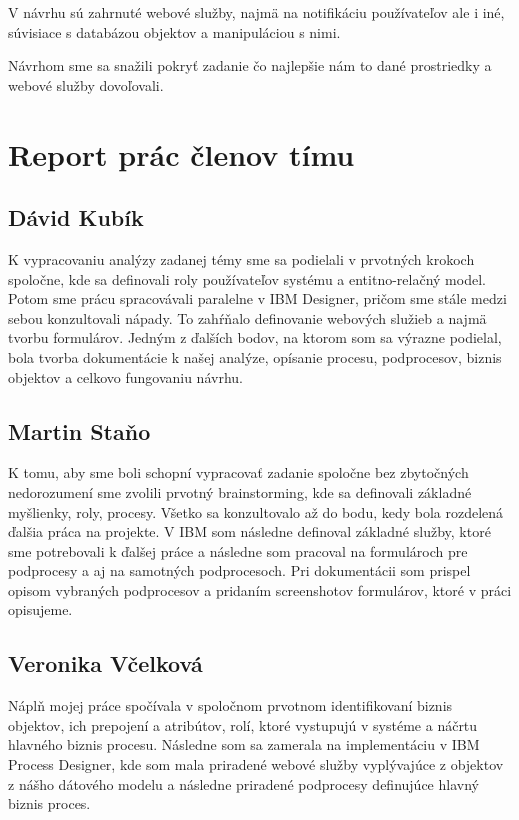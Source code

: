 \documentclass[10pt,oneside,slovak,a4paper]{article}
\begin{document}
V návrhu sú zahrnuté webové služby, najmä na notifikáciu používateľov ale i iné, súvisiace s databázou objektov a manipuláciou s nimi.

Návrhom sme sa snažili pokryť zadanie čo najlepšie nám to dané prostriedky a webové služby dovoľovali.

\section{Report prác členov tímu}
\subsection{Dávid Kubík}
K vypracovaniu analýzy zadanej témy sme sa podielali v prvotných krokoch spoločne, kde sa definovali roly používateľov systému a entitno-relačný model. Potom sme prácu spracovávali paralelne v IBM Designer, pričom sme stále medzi sebou konzultovali nápady. To zahŕňalo definovanie webových služieb a najmä tvorbu formulárov. Jedným z ďalších bodov, na ktorom som sa výrazne podielal, bola tvorba dokumentácie k našej analýze, opísanie procesu, podprocesov, biznis objektov a celkovo fungovaniu návrhu.
\subsection{Martin Staňo}
K tomu, aby sme boli schopní vypracovať zadanie spoločne bez zbytočných nedorozumení sme zvolili prvotný brainstorming, kde sa definovali základné myšlienky, roly, procesy. Všetko sa konzultovalo až do bodu, kedy bola rozdelená ďalšia práca na projekte. V IBM som následne definoval základné služby, ktoré sme potrebovali k ďalšej práce a následne som pracoval na formulároch pre podprocesy a aj na samotných podprocesoch. Pri dokumentácii som prispel opisom vybraných podprocesov a pridaním screenshotov formulárov, ktoré v práci opisujeme.
\subsection{Veronika Včelková}
Náplň mojej práce spočívala v spoločnom prvotnom identifikovaní biznis objektov, ich prepojení a atribútov, rolí, ktoré vystupujú v systéme a náčrtu hlavného biznis procesu. Následne som sa zamerala na implementáciu v IBM Process Designer, kde som mala priradené webové služby vyplývajúce z objektov z nášho dátového modelu a následne priradené podprocesy definujúce hlavný biznis proces.
\end{document}
